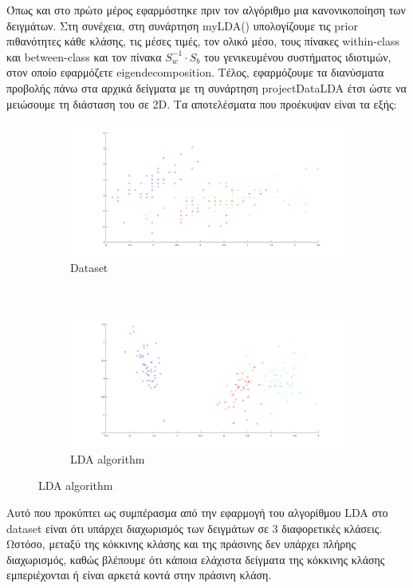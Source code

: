 \documentclass{article}
\begin{document}
	\noindent
	Όπως και στο πρώτο μέρος εφαρμόστηκε πριν τον αλγόριθμο μια κανονικοποίηση των δειγμάτων. Στη συνέχεια, στη συνάρτηση myLDA() υπολογίζουμε τις prior πιθανότητες κάθε κλάσης, τις μέσες τιμές, τον ολικό μέσο, τους πίνακες within-class και between-class και τον πίνακα $S_{w}^{-1}\cdot S_{b}$ του γενικευμένου συστήματος ιδιοτιμών, στον οποίο εφαρμόζετε eigendecomposition. Tέλος, εφαρμόζουμε τα διανύσματα προβολής πάνω στα αρχικά δείγματα με τη συνάρτηση projectDataLDA έτσι ώστε να μειώσουμε τη διάσταση του σε 2D. Τα αποτελέσματα που προέκυψαν είναι τα εξής:
	
	 \begin{figure}[h!]
		\centering
		\begin{subfigure}[t]{0.5\textwidth}
			\centering
			\includegraphics[width=\linewidth]{../exercise1_3/images/flowers_dataset.png}
			\caption{Dataset}
		\end{subfigure}%
		~
		\begin{subfigure}[t]{0.5\textwidth}
			\centering
			\includegraphics[width=\linewidth]{../exercise1_3/images/flowers_lda.png}
			\caption{LDA algorithm}
		\end{subfigure}
	\end{figure}

	\noindent
	Aυτό που προκύπτει ως συμπέρασμα από την εφαρμογή του αλγορίθμου LDA στο dataset είναι ότι υπάρχει διαχωρισμός των δειγμάτων σε 3 διαφορετικές κλάσεις. Ωστόσο, μεταξύ της κόκκινης κλάσης και της πράσινης δεν υπάρχει πλήρης διαχωρισμός, καθώς βλέπουμε ότι κάποια ελάχιστα δείγματα της κόκκινης κλάσης εμπεριέχονται ή είναι αρκετά κοντά στην πράσινη κλάση.
\end{document}
